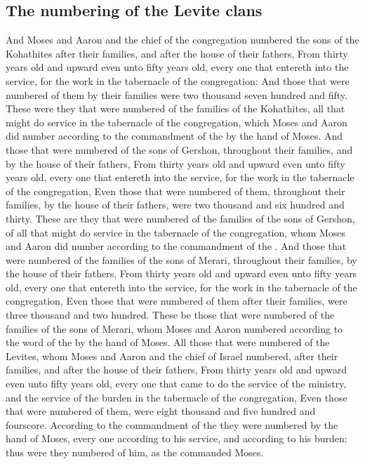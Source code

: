 \begin{biblechapter}
\section*{The numbering of the Levite clans}
\verse And Moses and Aaron and the chief of the congregation numbered the sons of the Kohathites after their families, and after the house of their fathers,
\verse From thirty years old and upward even unto fifty years old, every one that entereth into the service, for the work in the tabernacle of the congregation:
\verse And those that were numbered of them by their families were two thousand seven hundred and fifty.
\verse These were they that were numbered of the families of the Kohathites, all that might do service in the tabernacle of the congregation, which Moses and Aaron did number according to the commandment of the \LORD by the hand of Moses.
\verse And those that were numbered of the sons of Gershon, throughout their families, and by the house of their fathers,
\verse From thirty years old and upward even unto fifty years old, every one that entereth into the service, for the work in the tabernacle of the congregation,
\verse Even those that were numbered of them, throughout their families, by the house of their fathers, were two thousand and six hundred and thirty.
\verse These are they that were numbered of the families of the sons of Gershon, of all that might do service in the tabernacle of the congregation, whom Moses and Aaron did number according to the commandment of the \LORD.
\verse And those that were numbered of the families of the sons of Merari, throughout their families, by the house of their fathers,
\verse From thirty years old and upward even unto fifty years old, every one that entereth into the service, for the work in the tabernacle of the congregation,
\verse Even those that were numbered of them after their families, were three thousand and two hundred.
\verse These be those that were numbered of the families of the sons of Merari, whom Moses and Aaron numbered according to the word of the \LORD by the hand of Moses.
\verse All those that were numbered of the Levites, whom Moses and Aaron and the chief of Israel numbered, after their families, and after the house of their fathers,
\verse From thirty years old and upward even unto fifty years old, every one that came to do the service of the ministry, and the service of the burden in the tabernacle of the congregation,
\verse Even those that were numbered of them, were eight thousand and five hundred and fourscore.
\verse According to the commandment of the \LORD they were numbered by the hand of Moses, every one according to his service, and according to his burden: thus were they numbered of him, as the \LORD commanded Moses.
\end{biblechapter}

